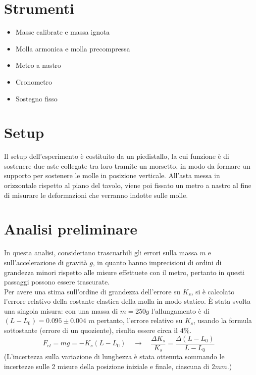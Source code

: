 \documentclass[12pt, a4paper]{article}
\begin{document}
\section{Strumenti}
    \begin{itemize}
    \setlength\itemsep{0cm}
        \item Masse calibrate e massa ignota
        \item Molla armonica e molla precompressa 
        \item Metro a nastro 
        \item Cronometro 
        \item Sostegno fisso 
    \end{itemize}



    
\section{Setup}
Il setup dell'esperimento è costituito da un piedistallo, la cui funzione è di sostenere due aste collegate tra loro tramite un morsetto, in modo da formare un supporto per sostenere le molle in posizione verticale.
All'asta messa in orizzontale rispetto al piano del tavolo, viene poi fissato un metro a nastro al fine di misurare le deformazioni che verranno indotte sulle molle. 





\section{Analisi preliminare}
In questa analisi, consideriano trascuarbili gli errori sulla massa $m$ e sull'accelerazione di gravità $g$, in quanto hanno imprecisioni di ordini di grandezza minori rispetto alle misure effettuete con il metro, pertanto in questi passaggi possono essere trascurate.\\

Per avere una stima sull'ordine di grandezza dell'errore su $K_s$, si è calcolato l'errore relativo della costante elastica della molla in modo statico. È stata svolta una singola misura: con una massa di $m=250g$ l'allungamento è di $(L-L_0)=0.095\pm 0.004$ $m$ pertanto, l'errore relativo su $K_s$, usando la formula sottostante (errore di un quoziente), risulta essere circa il $4\%$.
\begin{equation*}
    F_{el} = mg = -K_s(L-L_0) \quad \xrightarrow{} \quad   
    \frac{\Delta K_s}{K_s} = \frac{\Delta (L-L_0)}{L-L_0}
\end{equation*}
(L'incertezza sulla variazione di lunghezza è stata ottenuta sommando le incertezze sulle 2 misure della posizione iniziale e finale, ciascuna di $2mm$.) \\
\end{document}
